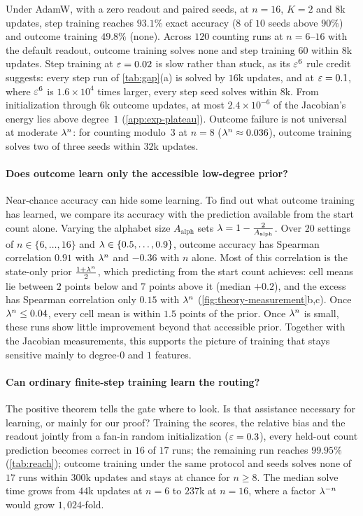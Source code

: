 Under AdamW, with a zero readout and paired seeds, at $n=16$, $K=2$ and $8$k updates, step training reaches
$93.1\%$ exact accuracy ($8$ of $10$ seeds above $90\%$) and outcome training $49.8\%$ (none). Across $120$ counting runs at
$n=6$--$16$ with the default readout, outcome training solves none and step training $60$ within $8$k updates. Step
training at $\varepsilon=0.02$ is slow rather than stuck, as its $\varepsilon^6$ rule credit suggests: every step run of
\cref{tab:gap}(a) is solved by $16$k updates, and at $\varepsilon=0.1$, where $\varepsilon^6$ is $1.6\times10^4$ times larger, every
step seed solves within $8$k. From initialization through $6$k outcome updates, at most $2.4\times10^{-6}$ of the Jacobian's
energy lies above degree~$1$ (\cref{app:exp-plateau}). Outcome failure is not universal at moderate $\lambda^n$: for counting
modulo~$3$ at $n=8$ ($\lambda^n\approx0.036$), outcome training solves two of three seeds within $32$k updates.

\paragraph{Does outcome learn only the accessible low-degree prior?} Near-chance accuracy can hide some learning. To find out what
outcome training has learned, we compare its accuracy with the prediction available from the start count alone. Varying the alphabet size $A_{\mathrm{alph}}$ sets $\lambda=1-\frac{2}{A_{\mathrm{alph}}}$. Over $20$ settings
of $n\in\{6,\ldots,16\}$ and $\lambda\in\{0.5,\ldots,0.9\}$, outcome accuracy has Spearman correlation $0.91$ with
$\lambda^n$ and $-0.36$ with $n$ alone. Most of this correlation is the state-only prior $\frac{1+\lambda^n}{2}$, which predicting
from the start count achieves: cell means lie between $2$ points below and $7$ points above it (median $+0.2$), and the excess
has Spearman correlation only $0.15$ with $\lambda^n$ (\cref{fig:theory-measurement}b,c). Once $\lambda^n\le0.04$, every
cell mean is within $1.5$ points of the prior. Once $\lambda^n$ is small, these runs show little improvement beyond that accessible prior. Together with the Jacobian measurements,
this supports the picture of training that stays sensitive mainly to degree-$0$ and $1$ features.

\paragraph{Can ordinary finite-step training learn the routing?} The positive theorem tells the gate where to look. Is that assistance
necessary for learning, or mainly for our proof? Training the scores, the relative bias and the readout jointly from a fan-in
random initialization ($\varepsilon=0.3$), every held-out count prediction becomes correct in $16$ of $17$ runs; the
remaining run reaches $99.95\%$ (\cref{tab:reach}); outcome training under the same protocol and seeds solves none of $17$
runs within $300$k updates and stays at chance for $n\ge8$. The median solve time grows from $44$k updates at $n=6$ to $237$k at
$n=16$, where a factor $\lambda^{-n}$ would grow $1{,}024$-fold.


